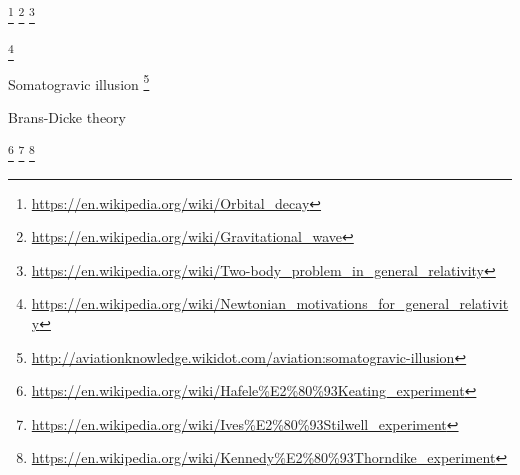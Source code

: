 
\footnote{\url{https://en.wikipedia.org/wiki/Orbital_decay}}%
\footnote{\url{https://en.wikipedia.org/wiki/Gravitational_wave}}%
\footnote{\url{https://en.wikipedia.org/wiki/Two-body_problem_in_general_relativity}}

\footnote{\url{https://en.wikipedia.org/wiki/Newtonian_motivations_for_general_relativity}}

Somatogravic illusion
\footnote{\url{http://aviationknowledge.wikidot.com/aviation:somatogravic-illusion}}

Brans-Dicke theory

\footnote{\url{https://en.wikipedia.org/wiki/Hafele\%E2\%80\%93Keating_experiment}}%
\footnote{\url{https://en.wikipedia.org/wiki/Ives\%E2\%80\%93Stilwell_experiment}}%
\footnote{\url{https://en.wikipedia.org/wiki/Kennedy\%E2\%80\%93Thorndike_experiment}}
